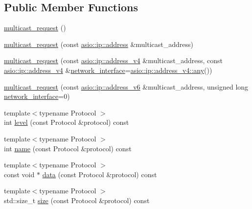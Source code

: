 \subsection*{Public Member Functions}
\begin{DoxyCompactItemize}
\item 
\hyperlink{classasio_1_1ip_1_1detail_1_1socket__option_1_1multicast__request_a10c8f0448c9bf61b3c51370fc8ec31cf}{multicast\+\_\+request} ()
\item 
\hyperlink{classasio_1_1ip_1_1detail_1_1socket__option_1_1multicast__request_a124cdb0ec5e825f0584c06476d4a66e5}{multicast\+\_\+request} (const \hyperlink{classasio_1_1ip_1_1address}{asio\+::ip\+::address} \&multicast\+\_\+address)
\item 
\hyperlink{classasio_1_1ip_1_1detail_1_1socket__option_1_1multicast__request_ad01c51bf697dd0736c7d3fe4c27dcf8d}{multicast\+\_\+request} (const \hyperlink{classasio_1_1ip_1_1address__v4}{asio\+::ip\+::address\+\_\+v4} \&multicast\+\_\+address, const \hyperlink{classasio_1_1ip_1_1address__v4}{asio\+::ip\+::address\+\_\+v4} \&\hyperlink{classasio_1_1ip_1_1detail_1_1socket__option_1_1network__interface}{network\+\_\+interface}=\hyperlink{classasio_1_1ip_1_1address__v4_aa8c839a88b3cfc1493e7c7fd83cbeba1}{asio\+::ip\+::address\+\_\+v4\+::any}())
\item 
\hyperlink{classasio_1_1ip_1_1detail_1_1socket__option_1_1multicast__request_adab187e3fd354b7e8ac0c1c1fde25740}{multicast\+\_\+request} (const \hyperlink{classasio_1_1ip_1_1address__v6}{asio\+::ip\+::address\+\_\+v6} \&multicast\+\_\+address, unsigned long \hyperlink{classasio_1_1ip_1_1detail_1_1socket__option_1_1network__interface}{network\+\_\+interface}=0)
\item 
{\footnotesize template$<$typename Protocol $>$ }\\int \hyperlink{classasio_1_1ip_1_1detail_1_1socket__option_1_1multicast__request_a7895286adaa762c7f20591c47df218dd}{level} (const Protocol \&protocol) const 
\item 
{\footnotesize template$<$typename Protocol $>$ }\\int \hyperlink{classasio_1_1ip_1_1detail_1_1socket__option_1_1multicast__request_a5b52c90a70a514207f7213e0e350886e}{name} (const Protocol \&protocol) const 
\item 
{\footnotesize template$<$typename Protocol $>$ }\\const void $\ast$ \hyperlink{classasio_1_1ip_1_1detail_1_1socket__option_1_1multicast__request_adef652e3e7d4a37ac66b1ecc61ea5ec5}{data} (const Protocol \&protocol) const 
\item 
{\footnotesize template$<$typename Protocol $>$ }\\std\+::size\+\_\+t \hyperlink{classasio_1_1ip_1_1detail_1_1socket__option_1_1multicast__request_a882c68cda8bc9ea7fadb3def4718e920}{size} (const Protocol \&protocol) const 
\end{DoxyCompactItemize}


